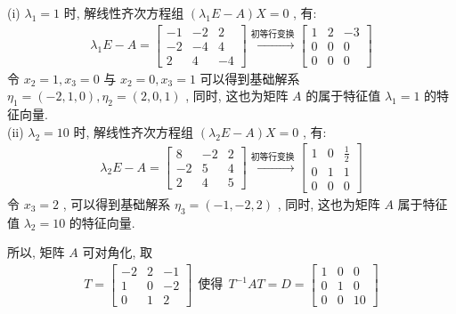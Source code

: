 \documentclass[11pt,a4paper,openany,oneside]{book}
\begin{document}
(i) $ \lambda_1 = 1 $ 时, 解线性齐次方程组 $ (\lambda_1E -A)X = 0 $ , 有:
\begin{gather*}
\lambda_1E - A =
\begin{bmatrix}
-1  &  -2  &  2  \\
-2  &  -4  &  4  \\
2  &  4  &  -4  
\end{bmatrix} \xrightarrow{初等行变换}
\begin{bmatrix}
1  &  2  &  -3  \\
0  &  0  &  0  \\
0  &  0  &  0
\end{bmatrix}
\end{gather*}
令 $ x_2 = 1, x_3 = 0 $ 与 $ x_2 = 0, x_3 =1 $ 可以得到基础解系 $ \eta_1 = (-2, 1, 0), \eta_2=(2, 0, 1) $ , 同时, 这也为矩阵 $ A $ 的属于特征值 $ \lambda_1 = 1 $ 的特征向量. \\

(ii) $ \lambda_2 = 10 $ 时, 解线性齐次方程组 $ (\lambda_2E-A)X = 0 $ , 有:
\begin{gather*}
\lambda_2E-A=
\begin{bmatrix}
8  &  -2  &  2  \\
-2  &  5  &  4  \\
2  &  4  &  5  
\end{bmatrix} \xrightarrow{\text{初等行变换}}
\begin{bmatrix}
1  &  0  &  \frac{1}{2}  \\
0  &  1  &  1  \\
0  &  0  &  0
\end{bmatrix}
\end{gather*}
令 $ x_3 = 2 $ , 可以得到基础解系 $ \eta_3 = (-1, -2, 2) $ , 同时, 这也为矩阵 $ A $ 属于特征值 $ \lambda_2=10 $ 的特征向量. 

所以, 矩阵 $ A $ 可对角化, 取
\begin{gather*}
T = 
\begin{bmatrix}
-2  &  2  &  -1  \\
1  &  0  &  -2  \\
0  &  1  &  2
\end{bmatrix} \ \ \text{使得} \ \ T^{-1}AT =D =
\begin{bmatrix}
1  &  0  &  0  \\
0  &  1  &  0  \\
0  &  0  &  10
\end{bmatrix}
\end{gather*}   \\ 
\end{document}
